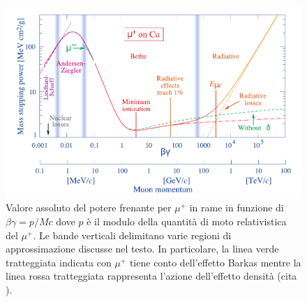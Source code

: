 \documentclass[12pt,a4paper,twoside]{report}
\begin{document}
	\begin{figure}[H]
		\centering
		\includegraphics[width=0.9\linewidth]{bethe_bloch.pdf}
		\caption{Valore assoluto del potere frenante per $\mu^+$ in rame in funzione di $\beta\gamma=p/Mc$ dove $p$ è il modulo della quantità di moto relativistica del $\mu^+$. Le bande verticali delimitano varie regioni di approssimazione discusse nel testo. In particolare, la linea verde tratteggiata indicata con $\mu^+$ tiene conto dell'effetto Barkas mentre la linea rossa tratteggiata rappresenta l'azione dell'effetto densità (cita
			).}
		\label{fig:bethe_bloch}
	\end{figure}
	
\end{document}
